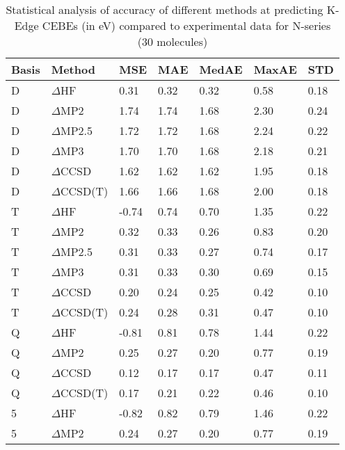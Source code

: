 \begin{table}
  \caption{Statistical analysis of accuracy of different methods at predicting K-Edge CEBEs (in eV) compared to experimental data for N-series (30 molecules)}
  \label{tbl:summary-n}
  \begin{tabular}{l l l l l l l }
    \toprule
    \textbf{Basis} & \textbf{Method} & \textbf{MSE} & \textbf{MAE} & \textbf{MedAE} & \textbf{MaxAE} & \textbf{STD} \\ 
    \midrule
    D & $\Delta$HF & 0.31 & 0.32 & 0.32 & 0.58 & 0.18 \\ 
    D & $\Delta$MP2 & 1.74 & 1.74 & 1.68 & 2.30 & 0.24 \\ 
    D & $\Delta$MP2.5 & 1.72 & 1.72 & 1.68 & 2.24 & 0.22 \\ 
    D & $\Delta$MP3 & 1.70 & 1.70 & 1.68 & 2.18 & 0.21 \\ 
    D & $\Delta$CCSD & 1.62 & 1.62 & 1.62 & 1.95 & 0.18 \\ 
    D & $\Delta$CCSD(T) & 1.66 & 1.66 & 1.68 & 2.00 & 0.18 \\ 
    T & $\Delta$HF & -0.74 & 0.74 & 0.70 & 1.35 & 0.22 \\ 
    T & $\Delta$MP2 & 0.32 & 0.33 & 0.26 & 0.83 & 0.20 \\ 
    T & $\Delta$MP2.5 & 0.31 & 0.33 & 0.27 & 0.74 & 0.17 \\ 
    T & $\Delta$MP3 & 0.31 & 0.33 & 0.30 & 0.69 & 0.15 \\ 
    T & $\Delta$CCSD & 0.20 & 0.24 & 0.25 & 0.42 & 0.10 \\ 
    T & $\Delta$CCSD(T) & 0.24 & 0.28 & 0.31 & 0.47 & 0.10 \\ 
    Q & $\Delta$HF & -0.81 & 0.81 & 0.78 & 1.44 & 0.22 \\ 
    Q & $\Delta$MP2 & 0.25 & 0.27 & 0.20 & 0.77 & 0.19 \\ 
    Q & $\Delta$CCSD & 0.12 & 0.17 & 0.17 & 0.47 & 0.11 \\ 
    Q & $\Delta$CCSD(T) & 0.17 & 0.21 & 0.22 & 0.46 & 0.10 \\ 
    5 & $\Delta$HF & -0.82 & 0.82 & 0.79 & 1.46 & 0.22 \\ 
    5 & $\Delta$MP2 & 0.24 & 0.27 & 0.20 & 0.77 & 0.19 \\ 
    \bottomrule
  \end{tabular}
\end{table}
